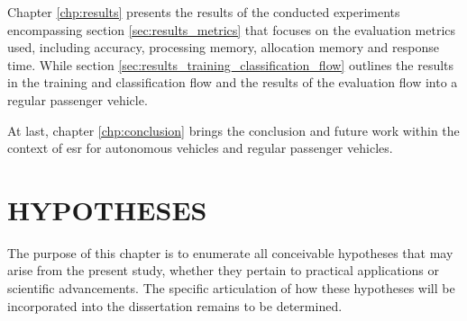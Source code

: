 Chapter \ref{chp:results} presents the results of the conducted experiments encompassing section \ref{sec:results_metrics} that focuses on the evaluation metrics used, including accuracy, processing memory, allocation memory and response time. While section \ref{sec:results_training_classification_flow} outlines the results in the training and classification flow and the results of the evaluation flow into a regular passenger vehicle.

At last, chapter \ref{chp:conclusion} brings the conclusion and future work within the context of \gls{esr} for autonomous vehicles and regular passenger vehicles.


\section{HYPOTHESES}
\label{sec:introduction_hypotheses}

The purpose of this chapter is to enumerate all conceivable hypotheses that may arise from the present study, whether they pertain to practical applications or scientific advancements. The specific articulation of how these hypotheses will be incorporated into the dissertation remains to be determined.

